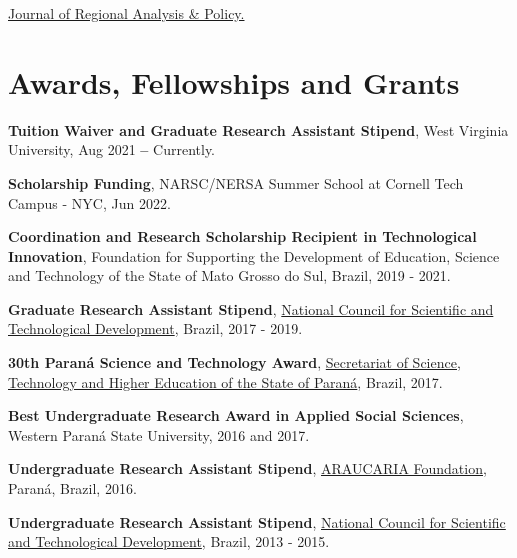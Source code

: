 \documentclass[letterpaper,11pt]{article}
\newcommand{\resumeSubHeadingListStart}{\begin{itemize}[leftmargin=0.15in, label={}]}
\newcommand{\resumeSubHeadingListEnd}{\end{itemize}}
\begin{document}
  \resumeSubHeadingListStart
    \small{\item{
        {\href{https://jrap.scholasticahq.com/}{Journal of Regional Analysis \& Policy.}}{} \\ \vspace{2pt}
    }}
  \resumeSubHeadingListEnd


 
\section{Awards, Fellowships and Grants}
\vspace{3pt}

  \resumeSubHeadingListStart
    \small{\item{
        \textbf{Tuition Waiver and Graduate Research Assistant Stipend}{, West Virginia University, Aug 2021 \textbf{--} Currently.} \\ \vspace{2pt}

        \textbf{Scholarship Funding}{, NARSC/NERSA Summer School at Cornell Tech Campus - NYC, Jun 2022.} \\ \vspace{2pt}

        \textbf{Coordination and Research Scholarship Recipient in Technological Innovation}{, Foundation for Supporting the Development of Education, Science and Technology of the State of Mato Grosso do Sul, Brazil, 2019 - 2021.} \\ \vspace{2pt}
        
        \textbf{Graduate Research Assistant Stipend}{, \href{https://memoria.cnpq.br/pibic/}{National Council for Scientific and Technological Development}, Brazil, 2017 - 2019.} \\ \vspace{2pt}
        
        \textbf{30th Paraná Science and Technology Award}{, \href{https://www.seti.pr.gov.br/ppct/}{Secretariat of Science, Technology and Higher Education of the State of Paraná}, Brazil, 2017.} \\ \vspace{2pt}
        
        \textbf{Best Undergraduate Research Award in Applied Social Sciences}{, Western Paraná State University, 2016 and 2017.} \\ \vspace{2pt}
        
        \textbf{Undergraduate Research Assistant Stipend}{, \href{https://www.fappr.pr.gov.br/}{ARAUCARIA Foundation}, Paraná, Brazil, 2016.} \\ \vspace{2pt}

        \textbf{Undergraduate Research Assistant Stipend}{, \href{https://memoria.cnpq.br/pibic/}{National Council for Scientific and Technological Development}, Brazil, 2013 - 2015.} \\ \vspace{2pt}

    }}
  \resumeSubHeadingListEnd
\end{document}
